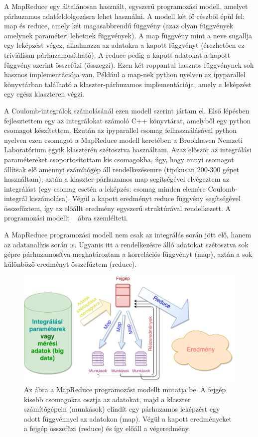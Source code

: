 \documentclass[11pt,a4paper]{article}
\numberwithin{equation}{subsection}
\numberwithin{figure}{section}
\begin{document}
A MapReduce egy általánosan használt, egyszerű programozási modell, amelyet párhuzamos adatfeldolgozásra lehet használni. A modell két fő részből épül fel: map és reduce, amely két magasabbrendű függvény (azaz olyan függvények amelynek paraméteri lehetnek függvények). A map függvény mint a neve sugallja egy leképzést végez, alkalmazza az adatokra a kapott függvényt (érezhetően ez triviálisan párhuzamosítható). A reduce pedig a kapott adatokat a kapott függvény szerint összefűzi (összegzi). Ezen két roppantul hasznos függvénynek sok hasznos implementációja van. Például a map-nek python nyelven az ipyparallel könyvtárban található a klaszter-párhuzamos implementációja, amely a leképzést egy egész klaszteren végzi. 

A Coulomb-integrálok számolásánál ezen modell szerint jártam el. Első lépésben fejlesztettem egy az integrálokat számoló C++ könyvtárat, amelyből egy python csomagot készítettem. Ezután az ipyparallel csomag felhasználásával python nyelven ezen csomagot a MapReduce modell keretében a Brookhaven Nemzeti Laboratórium egyik klaszterén szétosztva használtam. Azaz először az integrálási paramétereket csoportosítottam kis csomagokba, úgy, hogy annyi csomagot állítsak elő amennyi számítógép áll rendelkezésemre (tipikusan 200-300 gépet használtam), aztán a klaszter-párhuzamos map segítségével elvégeztem az integrálást (egy csomag esetén a leképzés: csomag minden elemére Coulomb-integrál kiszámolása). Végül a kapott eredményt reduce függvény segítségével összefűztem, így az előállt eredmény egyszerű struktúrával rendelkezett. A programozási modellt ~ ábra szemlélteti.

A MapReduce programozási modell nem csak az integrálás során jött elő, hanem az adatanalízis során is. Ugyanis itt a rendelkezésre álló adatokat szétosztva sok gépre párhuzamosítva meghatároztam a korrelációs függvényt (map), aztán a sok különböző eredményt összefűztem (reduce).

\begin{figure}[H]
\centering
\includegraphics[scale=0.4]{pic/prog/MapReduce}
\caption{Az ábra a MapReduce programozási modellt mutatja be. A fejgép kisebb csomagokra osztja az adatokat, majd a klaszter számítógépein (munkások) elindít egy párhuzamos leképzést egy adott függvénnyel az adatokon (map). Végül a kapott eredményeket a fejgép összefűzi (reduce) és így előáll a végeredmény. }
\label{fig:mapreduce}
\end{figure}
\end{document}

